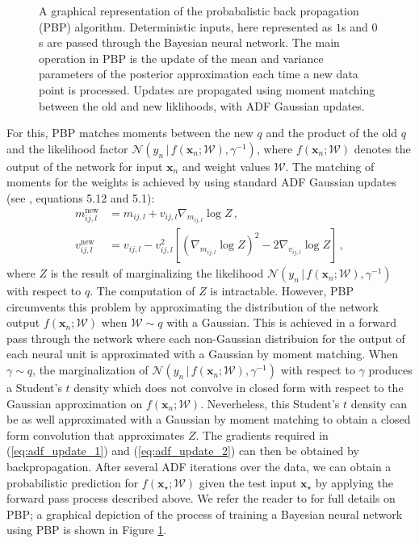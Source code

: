\documentclass{pnastwo}
\newcommand{\given}{\,|\,}
\begin{document}
\begin{article}
\begin{figure}[hb]
\caption{A graphical representation of the probabalistic back propagation (PBP) algorithm. Deterministic inputs, here represented as $1$s and $0$s are passed through the Bayesian neural network. The main operation in PBP is the update of the mean and variance parameters of the posterior approximation each time a new data point is processed. Updates are propagated using moment matching between the old and new liklihoods, with ADF Gaussian updates.}
\label{fig:pbp}
\end{figure} 
For this, PBP matches moments between
the new $q$ and the product of the old $q$ and the likelihood factor
$\mathcal{N}(y_n\given f(\mathbf{x}_n;\mathcal{W}),\gamma^{-1})$,
where $f(\mathbf{x}_n;\mathcal{W})$ denotes the output of the network for input $\mathbf{x}_n$ and weight values $\mathcal{W}$.
The matching of moments for the weights is achieved by using standard ADF Gaussian updates (see
\cite{minka2001family}, equations 5.12 and 5.1):
\begin{align}
m_{ij,l}^\text{new} & = m_{ij,l} + v_{ij,l} \nabla_{m_{ij,l}} \log Z \,,\label{eq:adf_update_1}\\
v_{ij,l}^\text{new} & = v_{ij,l} - v_{ij,l}^2 \left[ (\nabla_{m_{ij,l}} \log Z)^2 - 2 \nabla_{v_{ij,l}} \log Z \right]\,,\label{eq:adf_update_2}
\end{align}
where $Z$ is the result of marginalizing the likelihood $\mathcal{N}(y_n\given f(\mathbf{x}_n;\mathcal{W}),\gamma^{-1})$ with
respect to $q$. The computation of $Z$ is intractable. However, PBP circumvents this problem by
approximating the distribution of the network output $f(\mathbf{x}_n;\mathcal{W})$ when $\mathcal{W} \sim q$ with a Gaussian. 
This is achieved in a forward pass through the network where each non-Gaussian distribuion
for the output of each neural unit is approximated with a Gaussian by moment matching.
When $\gamma\sim q$, the marginalization of $\mathcal{N}(y_n\given f(\mathbf{x}_n;\mathcal{W}),\gamma^{-1})$ 
with respect to $\gamma$ produces a Student's $t$ density which does not
convolve in closed form with respect to the Gaussian approximation on $f(\mathbf{x}_n;\mathcal{W})$. Neverheless, this Student's
$t$ density can be as well approximated with a Gaussian by moment matching to obtain a closed form convolution that approximates $Z$.
The gradients required in (\ref{eq:adf_update_1}) and (\ref{eq:adf_update_2}) can then be obtained by backpropagation.
After several ADF iterations over the data,  we can obtain a probabilistic
prediction for $f(\mathbf{x}_\star;\mathcal{W})$ given the test input
$\mathbf{x}_\star$ by applying the forward pass process described above.  We
refer the reader to \cite{hernandez2015probabilistic} for full details on PBP; a graphical depiction of the process of training a Bayesian neural network using PBP is shown in Figure \ref{fig:pbp}.



\end{article}
\end{document}
